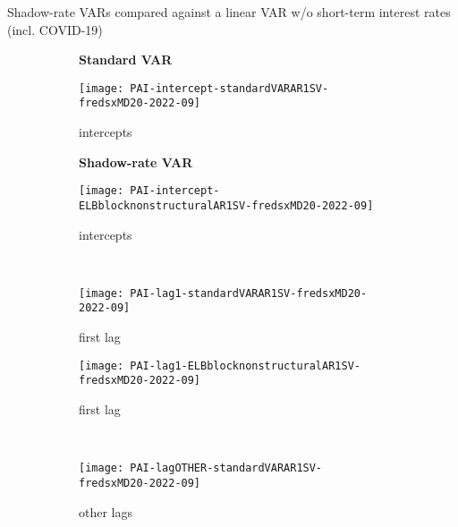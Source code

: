 \documentclass[12pt]{article}
\newcommand{\imagesandtables}{foo}
\newlength{\picwid}
\begin{document}
\clearpage
\begin{table}
	\caption{Shadow-rate VARs compared against a linear VAR w/o short-term interest rates (incl. COVID-19)}
	\label{tab:oos:OnlyLongYields:2022-08}
	\begin{small}
	
	\end{small}
\end{table}

\clearpage
\renewcommand\thefigure{C.\arabic{figure}}

\begin{figure}
\setlength{\picwid}{.4\textwidth}
\caption{Parameter changes over time}
\label{fig:PAIsinceGFC0}
\begin{center}
\begin{subfigure}[b]{\picwid}
\centering\textbf{Standard VAR}\vspace{0.5\baselineskip}
\caption{intercepts}
\label{subfig:pai:standard:intercepts}
\texttt{[image: PAI-intercept-standardVARAR1SV-fredsxMD20-2022-09]}
\end{subfigure}
\quad
\begin{subfigure}[b]{\picwid}
\centering\textbf{Shadow-rate VAR}\vspace{0.5\baselineskip}
\caption{intercepts}
\label{subfig:pai:nonstructural:intercepts}
\texttt{[image: PAI-intercept-ELBblocknonstructuralAR1SV-fredsxMD20-2022-09]}
\end{subfigure}
\\
\begin{subfigure}[b]{\picwid}
\caption{first lag}
\label{subfig:pai:standard:lag1}
\texttt{[image: PAI-lag1-standardVARAR1SV-fredsxMD20-2022-09]}
\end{subfigure}
\quad
\begin{subfigure}[b]{\picwid}
\caption{first lag}
\label{subfig:pai:nonstructural:lag1}
\texttt{[image: PAI-lag1-ELBblocknonstructuralAR1SV-fredsxMD20-2022-09]}
\end{subfigure}
\\
\begin{subfigure}[b]{\picwid}
\caption{other lags}
\label{subfig:pai:standard:lagother}
\texttt{[image: PAI-lagOTHER-standardVARAR1SV-fredsxMD20-2022-09]}
\end{subfigure}
\quad
\begin{subfigure}[b]{\picwid}

\end{subfigure}
\end{center}
\end{figure}
\end{document}
